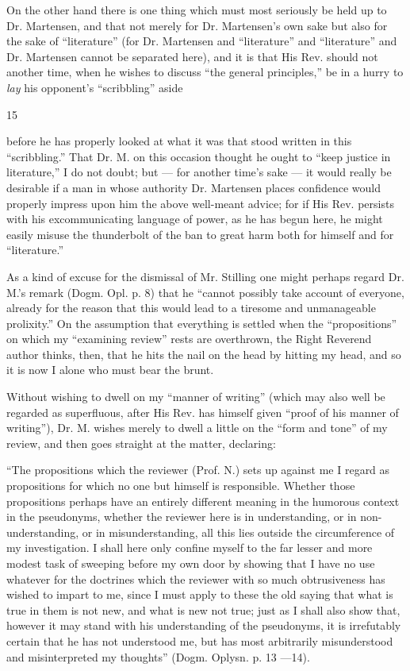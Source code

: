 \documentclass[12pt,a4paper,openany]{book}
\newcommand{\opage}[1]{\marginnote{\footnotesize\textit{[#1]}}}
\begin{document}
On the other hand there is one thing which must most
seriously be held up to Dr. Martensen, and that not merely for Dr. Martensen's own sake but also for the sake of ``literature''
(for Dr. Martensen and ``literature'' and ``literature'' and
Dr. Martensen cannot be separated here), and it is that
His Rev. should not another time, when he wishes to discuss
``the general principles,'' be in a hurry
to \emph{lay} his opponent's ``scribbling'' aside
\setcounter{footnote}{0}%
\opage{45}\begin{center}15\end{center}


before he has properly looked at what it was that stood
written in this ``scribbling.'' That Dr. M. on this
occasion thought he ought to ``keep justice in literature,''
I do not doubt; but --- for another time's sake ---
it would really be desirable if a man in whose authority
Dr. Martensen places confidence would properly impress upon him
the above well-meant advice; for if His Rev. persists with
his excommunicating language of power, as he has begun here,
he might easily misuse the thunderbolt of the ban to great harm
both for himself and for ``literature.''

As a kind of excuse for the dismissal of Mr. Stilling
one might perhaps regard Dr. M.'s remark
(Dogm. Opl. p. 8) that he ``cannot possibly take account of
everyone, already for the reason that this would lead to a tiresome
and unmanageable prolixity.'' On the assumption
that everything is settled when the ``propositions'' on which my
``examining review'' rests are overthrown, the Right Reverend
author thinks, then, that he hits the nail on the head
by hitting my head, and so it is now I alone
who must bear the brunt.

Without wishing to dwell on my ``manner of writing'' (which
may also well be regarded as superfluous, after His Rev. has himself
given ``proof of his manner of writing''), Dr. M. wishes merely to
dwell a little on the ``form and tone'' of my review,
and then goes straight at the matter, declaring:

``The propositions which the reviewer (Prof. N.) sets up against
me I regard as propositions for which no one but
himself is responsible. Whether those propositions perhaps have
an entirely different meaning in the humorous context
\setcounter{footnote}{0}%
\opage{46}in the pseudonyms, whether the reviewer here is in understanding,
or in non-understanding, or in misunderstanding, all this lies
outside the circumference of my investigation. I shall here only
confine myself to the far lesser and more modest task
of sweeping before my own door by showing that I have no
use whatever for the doctrines which the reviewer with so much
obtrusiveness has wished to impart to me, since I must
apply to these the old saying that what is true in them is not
new, and what is new not true; just as I shall also show that,
however it may stand with his understanding
of the pseudonyms, it is irrefutably certain that he has not
understood me, but has most arbitrarily misunderstood and
misinterpreted my thoughts'' (Dogm. Oplysn. p. 13 ---14).
\end{document}

